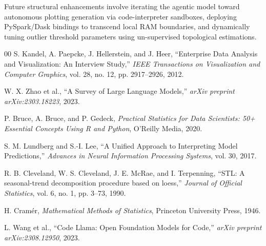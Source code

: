 \documentclass[conference]{IEEEtran}
\begin{document}
Future structural enhancements involve iterating the agentic model toward autonomous plotting generation via code-interpreter sandboxes, deploying PySpark/Dask bindings to transcend local RAM boundaries, and dynamically tuning outlier threshold parameters using un-supervised topological estimations.

\begin{thebibliography}{00}
S. Kandel, A. Paepcke, J. Hellerstein, and J. Heer, ``Enterprise Data Analysis and Visualization: An Interview Study,'' \emph{IEEE Transactions on Visualization and Computer Graphics}, vol. 28, no. 12, pp. 2917--2926, 2012.

W. X. Zhao et al., ``A Survey of Large Language Models,'' \emph{arXiv preprint arXiv:2303.18223}, 2023.

P. Bruce, A. Bruce, and P. Gedeck, \emph{Practical Statistics for Data Scientists: 50+ Essential Concepts Using R and Python}, O'Reilly Media, 2020.

S. M. Lundberg and S.-I. Lee, ``A Unified Approach to Interpreting Model Predictions,'' \emph{Advances in Neural Information Processing Systems}, vol. 30, 2017.

R. B. Cleveland, W. S. Cleveland, J. E. McRae, and I. Terpenning, ``STL: A seasonal-trend decomposition procedure based on loess,'' \emph{Journal of Official Statistics}, vol. 6, no. 1, pp. 3--73, 1990.

H. Cram\'er, \emph{Mathematical Methods of Statistics}, Princeton University Press, 1946.

L. Wang et al., ``Code Llama: Open Foundation Models for Code,'' \emph{arXiv preprint arXiv:2308.12950}, 2023.
\end{thebibliography}
\end{document}
